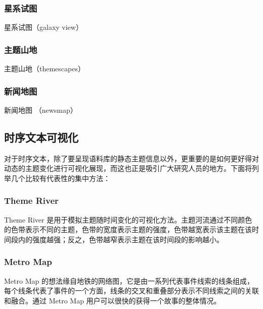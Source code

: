 \subsubsection{星系试图}
星系试图（galaxy view）

\subsubsection{主题山地}
主题山地（themescapes）

\subsubsection{新闻地图}
新闻地图 （newsmap）

\subsection{时序文本可视化}
对于时序文本，除了要呈现语料库的静态主题信息以外，更重要的是如何更好得对动态的主题变化进行可视化展现，而这也正是吸引广大研究人员的地方。下面将列举几个比较有代表性的集中方法：
\subsubsection{Theme River}
Theme River \cite{Havre:2000}是用于模拟主题随时间变化的可视化方法。主题河流通过不同颜色的色带表示不同的主题，色带的宽度表示主题的强度，色带越宽表示该主题在该时间段内的强度越强；反之，色带越窄表示主题在该时间段的影响越小。

\subsubsection{Metro Map}
Metro Map \cite{shahaf2012trains} 的想法缘自地铁的网络图，它是由一系列代表事件线索的线条组成，每个线条代表了事件的一个方面，线条的交叉和重叠部分表示不同线索之间的关联和融合。通过 Metro Map 用户可以很快的获得一个故事的整体情况。
